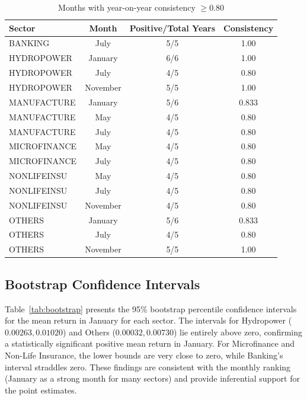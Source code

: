 \documentclass[12pt,a4paper,fleqn]{article}
\begin{document}
\begin{table}[ht]
\centering
\caption{Months with year-on-year consistency \(\ge 0.80\)}
\label{tab:consistency}
\begin{tabular}{lccc}
\toprule
Sector & Month & Positive/Total Years & Consistency \\
\midrule
BANKING       & July    & 5/5  & 1.00 \\
\addlinespace
HYDROPOWER    & January & 6/6  & 1.00 \\
HYDROPOWER    & July    & 4/5  & 0.80 \\
HYDROPOWER    & November& 5/5  & 1.00 \\
\addlinespace
MANUFACTURE   & January & 5/6  & 0.833 \\
MANUFACTURE   & May     & 4/5  & 0.80 \\
MANUFACTURE   & July    & 4/5  & 0.80 \\
\addlinespace
MICROFINANCE  & May     & 4/5  & 0.80 \\
MICROFINANCE  & July    & 4/5  & 0.80 \\
\addlinespace
NONLIFEINSU   & May     & 4/5  & 0.80 \\
NONLIFEINSU   & July    & 4/5  & 0.80 \\
NONLIFEINSU   & November& 4/5  & 0.80 \\
\addlinespace
OTHERS        & January & 5/6  & 0.833 \\
OTHERS        & July    & 4/5  & 0.80 \\
OTHERS        & November& 5/5  & 1.00 \\
\bottomrule
\end{tabular}
\end{table}

\subsection{Bootstrap Confidence Intervals}

Table~\ref{tab:bootstrap} presents the 95\% bootstrap percentile confidence intervals for the mean return in January for each sector. The intervals for Hydropower (\(0.00263, 0.01020\)) and Others (\(0.00032, 0.00730\)) lie entirely above zero, confirming a statistically significant positive mean return in January. For Microfinance and Non-Life Insurance, the lower bounds are very close to zero, while Banking's interval straddles zero. These findings are consistent with the monthly ranking (January as a strong month for many sectors) and provide inferential support for the point estimates.
\end{document}
